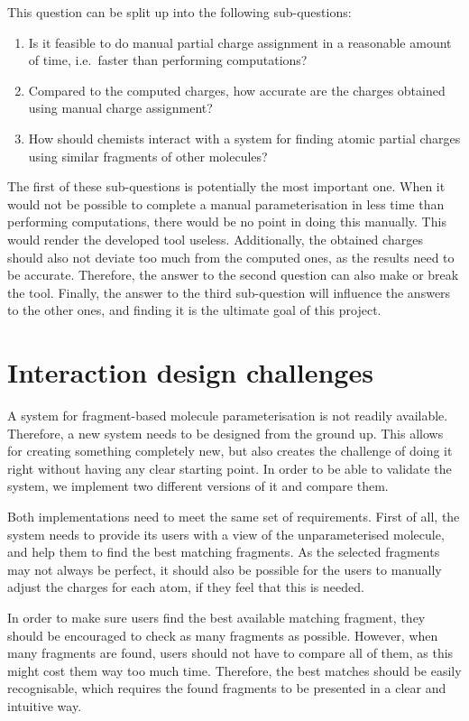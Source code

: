 This question can be split up into the following sub-questions:
\begin{enumerate}
\item Is it feasible to do manual partial charge assignment in a reasonable amount of time, i.e.\ faster than performing computations?
\item Compared to the computed charges, how accurate are the charges obtained using manual charge assignment?
\item How should chemists interact with a system for finding atomic partial charges using similar fragments of other molecules?
\end{enumerate}

The first of these sub-questions is potentially the most important one. When it would not be possible to complete a manual parameterisation in less time than performing computations, there would be no point in doing this manually. This would render the developed tool useless. Additionally, the obtained charges should also not deviate too much from the computed ones, as the results need to be accurate. Therefore, the answer to the second question can also make or break the tool. Finally, the answer to the third sub-question will influence the answers to the other ones, and finding it is the ultimate goal of this project.



\section[Challenges]{Interaction design challenges}
A system for fragment-based molecule parameterisation is not readily available. Therefore, a new system needs to be designed from the ground up. This allows for creating something completely new, but also creates the challenge of doing it right without having any clear starting point. In order to be able to validate the system, we implement two different versions of it and compare them.

Both implementations need to meet the same set of requirements. First of all, the system needs to provide its users with a view of the unparameterised molecule, and help them to find the best matching fragments. As the selected fragments may not always be perfect, it should also be possible for the users to manually adjust the charges for each atom, if they feel that this is needed.

In order to make sure users find the best available matching fragment, they should be encouraged to check as many fragments as possible. However, when many fragments are found, users should not have to compare all of them, as this might cost them way too much time. Therefore, the best matches should be easily recognisable, which requires the found fragments to be presented in a clear and intuitive way.


